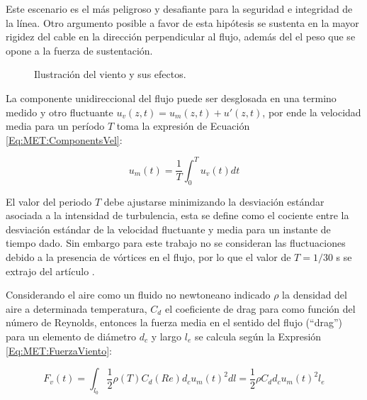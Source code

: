 Este escenario es el más peligroso y desafiante para la seguridad e integridad de la línea. Otro argumento posible a favor de esta hipótesis se sustenta en la mayor rigidez del cable en la dirección perpendicular al flujo, además del el peso que se opone a la fuerza de sustentación.
\begingroup
\begin{figure}[htbp]
	\centering
	\label{fig:MET:Viento:EsqViento}
	\label{fig:MET:Viento:DragLift}
	\caption{Ilustración del viento y sus efectos.} 	\label{fig:Met:Viento:Esquemas}
\end{figure}
\endgroup
La componente unidireccional del flujo puede ser desglosada en una termino medido y otro fluctuante $u_v(z,t)=u_m(z,t)+{u}'(z,t)$, por ende la velocidad media para un período $T$ toma la expresión de Ecuación \eqref{Eq:MET:ComponentsVel}:


\begin{equation}\label{Eq:MET:ComponentsVel}
	u_m(t)=\frac{1}{T}\int_{0}^{T}u_v(t)dt
\end{equation}


El valor del periodo $T$ debe ajustarse minimizando la desviación estándar asociada a la intensidad de turbulencia, esta se define como el cociente entre la desviación estándar de la velocidad fluctuante y  media para un instante de tiempo dado. Sin embargo para este trabajo no se consideran las fluctuaciones debido a la presencia de vórtices en el flujo, por lo que el valor de $T=1/30$ s se extrajo del artículo \citep{stengel2017measurements}.

Considerando el aire como un fluido no newtoneano indicado $\rho$ la densidad del aire a determinada temperatura, $C_d$ el coeficiente de drag para como función del número de Reynolds, entonces la fuerza media en el sentido del flujo (``drag'') para un elemento de diámetro $d_c$ y largo $l_e$ se calcula según la Expresión \eqref{Eq:MET:FuerzaViento}:

\begin{center}
	\begin{equation}
		\label{Eq:MET:FuerzaViento}
		F_v(t)=\int_{l_0}\frac{1}{2}{\rho (T)C_d(Re)d_cu_m(t)^2} dl= \frac{1}{2}\rho C_dd_cu_m(t)^2l_{e}
	\end{equation}
\end{center}



